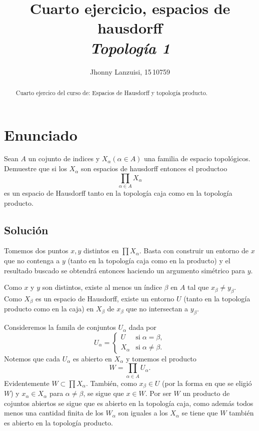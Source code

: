 \title{Cuarto ejercicio, espacios de hausdorff\\ \large\em Topología 1}
\author{Jhonny Lanzuisi, 15\,10759}
\maketitle

\begin{abstract}
    Cuarto ejercico del curso de: Espacios de Hausdorff y
    topología producto.
\end{abstract}


\section[Enunciado]{Enunciado}
Sean $A$ un cojunto de indices y $X_{\alpha} (\alpha\in A)$ una familia de espacio topológicos.
Demuestre que si los $X_{\alpha}$ son espacios de hausdorff
entonces el productoo
\[
    \prod_{\alpha\in A} X_{\alpha}
\]
es un espacio de Hausdorff tanto en la topología caja como en la topología producto.

\subsection{Solución}
Tomemos dos puntos $x,y$ distintos en $\prod X_{\alpha}$. Basta con construir
un entorno de $x$ que no contenga a $y$ (tanto en la topología caja como en la producto)
y el resultado buscado se obtendrá entonces haciendo un argumento simétrico para $y$.

Como $x$ y $y$ son distintos,
existe al menos un índice $\beta$ en $A$ tal que $x_{\beta}\neq y_{\beta}$.
Como $X_{\beta}$ es un espacio de Hausdorff, existe  un entorno $U$
(tanto en la topología producto como en la caja)
 en $X_{\beta}$ de $x_{\beta}$ que no intersectan a $y_{\beta}$.

Consideremos la famila de conjuntos $U_\alpha$ dada por
\[
    U_{\alpha}=
        \begin{cases}
            U &\text{si}\;\alpha=\beta,\\
            X_\alpha &\text{si}\;\alpha\neq \beta.
        \end{cases}
\]
Notemos que cada $U_\alpha$ es abierto en $X_\alpha$ y tomemos el producto
\[
    W=\prod_{\alpha\in A} U_\alpha.
\]
Evidentemente $W\subset\prod X_{\alpha}$. También, como $x_{\beta}\in U$
(por la forma en que se eligió $W$) y $x_\alpha\in X_{\alpha}$ para
$\alpha\neq\beta$, se sigue que $x\in W$. Por ser $W$ un producto
de cojuntos abiertos se sigue que es abierto en la topología
caja, como además todos menos una cantidad finita de los
$W_\alpha$ son iguales a los $X_\alpha$ se tiene que $W$ también
es abierto en la topología producto.

